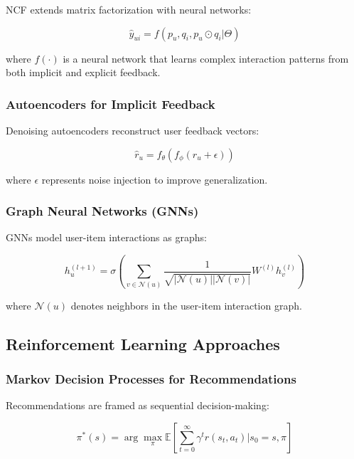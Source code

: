 \documentclass[acmsmall,review,anonymous]{acmart}
\begin{document}
NCF extends matrix factorization with neural networks:

\begin{equation}
\hat{y}_{ui} = f(p_u, q_i, p_u \odot q_i | \Theta)
\label{eq:ncf}
\end{equation}

where $f(\cdot)$ is a neural network that learns complex interaction patterns from both implicit and explicit feedback.

\subsubsection{Autoencoders for Implicit Feedback}

Denoising autoencoders reconstruct user feedback vectors:

\begin{equation}
\hat{r}_u = f_\theta(f_\phi(r_u + \epsilon))
\label{eq:autoencoder}
\end{equation}

where $\epsilon$ represents noise injection to improve generalization.

\subsubsection{Graph Neural Networks (GNNs)}

GNNs model user-item interactions as graphs:

\begin{equation}
h_u^{(l+1)} = \sigma\left(\sum_{v \in \mathcal{N}(u)} \frac{1}{\sqrt{|\mathcal{N}(u)||\mathcal{N}(v)|}} W^{(l)} h_v^{(l)}\right)
\label{eq:gnn}
\end{equation}

where $\mathcal{N}(u)$ denotes neighbors in the user-item interaction graph.

\subsection{Reinforcement Learning Approaches}

\subsubsection{Markov Decision Processes for Recommendations}

Recommendations are framed as sequential decision-making:

\begin{equation}
\pi^*(s) = \arg\max_\pi \mathbb{E}\left[\sum_{t=0}^\infty \gamma^t r(s_t, a_t) \bigg| s_0 = s, \pi\right]
\label{eq:rl_mdp}
\end{equation}
\end{document}
